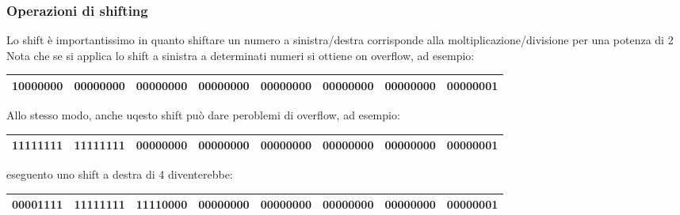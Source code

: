 \subsubsection*{Operazioni di shifting}
Lo shift è importantissimo in quanto shiftare un numero a sinistra/destra corrisponde alla moltiplicazione/divisione per una potenza di 2
Nota che se si applica lo shift a sinistra a determinati numeri si ottiene on overflow, ad esempio:
\begin{center}
	\begin{footnotesize}
		\begin{tabular}{|c c c c c c c c|}
			\hline
			10000000 & 00000000 & 00000000 & 00000000 & 00000000 & 00000000 & 00000000 & 00000001 \\
			\hline
		\end{tabular}
	\end{footnotesize}%
\end{center}
Allo stesso modo, anche uqesto shift può dare peroblemi di overflow, ad esempio:
\begin{center}
	\begin{footnotesize}
		\begin{tabular}{|c c c c c c c c|}
			\hline
			11111111 & 11111111 & 00000000 & 00000000 & 00000000 & 00000000 & 00000000 & 00000001 \\
			\hline
		\end{tabular}
	\end{footnotesize}%
\end{center}
eseguento uno shift a destra di 4 diventerebbe:
\begin{center}
	\begin{footnotesize}
		\begin{tabular}{|c c c c c c c c|}
			\hline
			00001111 & 11111111 & 11110000 & 00000000 & 00000000 & 00000000 & 00000000 & 00000001 \\
			\hline
		\end{tabular}
	\end{footnotesize}%
\end{center}
